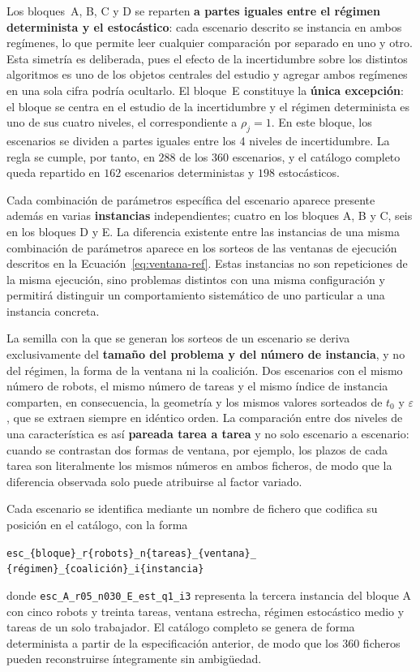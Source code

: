 Los bloques~A, B, C y D se reparten \textbf{a partes iguales entre el régimen determinista y el estocástico}: cada escenario descrito se instancia en ambos regímenes, lo que permite leer cualquier comparación por separado en uno y otro. Esta simetría es deliberada, pues el efecto de la incertidumbre sobre los distintos algoritmos es uno de los objetos centrales del estudio y agregar ambos regímenes en una sola cifra podría ocultarlo. El bloque~E constituye la \textbf{única excepción}: el bloque se centra en el estudio de la incertidumbre y el régimen determinista es uno de sus cuatro niveles, el correspondiente a $\rho_j=1$. En este bloque, los escenarios se dividen a partes iguales entre los 4 niveles de incertidumbre. La regla se cumple, por tanto, en $288$ de los $360$ escenarios, y el catálogo completo queda repartido en $162$ escenarios deterministas y $198$ estocásticos.

Cada combinación de parámetros específica del escenario aparece presente además en varias \textbf{instancias} independientes; cuatro en los bloques A, B y C, seis en los bloques D y E. La diferencia existente entre las instancias de una misma combinación de parámetros aparece en los sorteos de las ventanas de ejecución descritos en la Ecuación~\eqref{eq:ventana-ref}. Estas instancias no son repeticiones de la misma ejecución, sino problemas distintos con una misma configuración y permitirá distinguir un comportamiento sistemático de uno particular a una instancia concreta.

La semilla con la que se generan los sorteos de un escenario se deriva exclusivamente del \textbf{tamaño del problema y del número de instancia}, y no del régimen, la forma de la ventana ni la coalición. Dos escenarios con el mismo número de robots, el mismo número de tareas y el mismo índice de instancia comparten, en consecuencia, la geometría y los mismos valores sorteados de $t_0$ y $\varepsilon$, que se extraen siempre en idéntico orden. La comparación entre dos niveles de una característica es así \textbf{pareada tarea a tarea} y no solo escenario a escenario: cuando se contrastan dos formas de ventana, por ejemplo, los plazos de cada tarea son literalmente los mismos números en ambos ficheros, de modo que la diferencia observada solo puede atribuirse al factor variado.

Cada escenario se identifica mediante un nombre de fichero que codifica su posición en el catálogo, con la forma
\begin{center}
\texttt{esc\_\{bloque\}\_r\{robots\}\_n\{tareas\}\_}\texttt{\{ventana\}\_ \\
\{régimen\}\_\{coalición\}\_i\{instancia\}}
\end{center}
donde \texttt{esc\_A\_r05\_n030\_E\_est\_q1\_i3} representa la tercera instancia del bloque A con cinco robots y treinta tareas, ventana estrecha, régimen estocástico medio y tareas de un solo trabajador. El catálogo completo se genera de forma determinista a partir de la especificación anterior, de modo que los $360$ ficheros pueden reconstruirse íntegramente sin ambigüedad.


